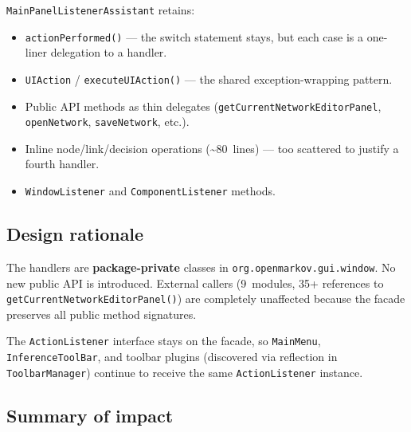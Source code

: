 \documentclass[12pt,a4paper]{article}
\newcommand{\code}[1]{\texttt{#1}}
\newcommand{\cls}[1]{\texttt{#1}}
\newcommand{\meth}[1]{\texttt{#1}}
\begin{document}
\cls{MainPanelListenerAssistant} retains:
\begin{itemize}[nosep]
  \item \meth{actionPerformed()} --- the switch statement stays, but
        each case is a one-liner delegation to a handler.
  \item \code{UIAction} / \meth{executeUIAction()} --- the shared
        exception-wrapping pattern.
  \item Public API methods as thin delegates (\meth{getCurrentNetworkEditorPanel},
        \meth{openNetwork}, \meth{saveNetwork}, etc.).
  \item Inline node/link/decision operations (\textasciitilde80~lines)
        --- too scattered to justify a fourth handler.
  \item \code{WindowListener} and \code{ComponentListener} methods.
\end{itemize}

\subsection{Design rationale}

The handlers are \textbf{package-private} classes in
\code{org.openmarkov.gui.window}. No new public API is introduced.
External callers (9~modules, 35+ references to
\meth{getCurrentNetworkEditorPanel()}) are completely unaffected because
the facade preserves all public method signatures.

The \code{ActionListener} interface stays on the facade, so
\cls{MainMenu}, \cls{InferenceToolBar}, and toolbar plugins
(discovered via reflection in \cls{ToolbarManager}) continue to
receive the same \code{ActionListener} instance.

\subsection{Summary of impact}
\end{document}
